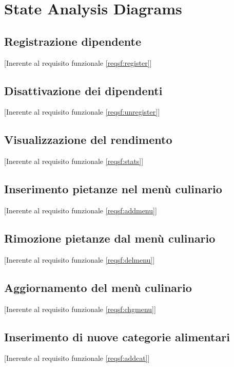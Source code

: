 	\section{State Analysis Diagrams}
	\subsection{Registrazione dipendente}[Inerente al requisito funzionale \ref{reqsf:register}]

	\newpage\subsection{Disattivazione dei dipendenti}[Inerente al requisito funzionale \ref{reqsf:unregister}]

	\newpage\subsection{Visualizzazione del rendimento}[Inerente al requisito funzionale \ref{reqsf:stats}]

	\newpage\subsection{Inserimento pietanze nel menù culinario}[Inerente al requisito funzionale \ref{reqsf:addmenu}]

	\newpage\subsection{Rimozione pietanze dal menù culinario}[Inerente al requisito funzionale \ref{reqsf:delmenu}]

	\newpage\subsection{Aggiornamento del menù culinario}[Inerente al requisito funzionale \ref{reqsf:chgmenu}]

	\newpage\subsection{Inserimento di nuove categorie alimentari}[Inerente al requisito funzionale \ref{reqsf:addcat}]


